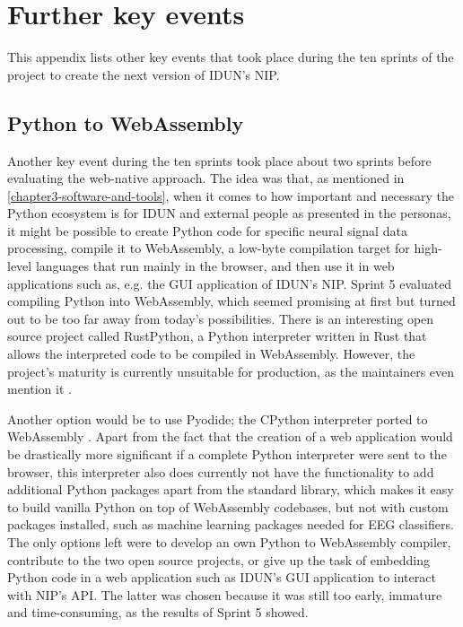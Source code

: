 \chapter{Further key events}
\label{appendix4-further-key-events}
\graphicspath{{Appendix4/Figs/}{Appendix4/Figs/}}

This appendix lists other key events that took place during the ten sprints of the project to create the next version of IDUN's NIP.

\section*{Python to WebAssembly}
\label{chapter4-python-to-webassembly}

Another key event during the ten sprints took place about two sprints before evaluating the web-native approach. The idea was that, as mentioned in \autoref{chapter3-software-and-tools}, when it comes to how important and necessary the Python ecosystem is for IDUN and external people as presented in the personas, it might be possible to create Python code for specific neural signal data processing, compile it to WebAssembly, a low-byte compilation target for high-level languages that run mainly in the browser, and then use it in web applications such as, e.g. the GUI application of IDUN's NIP. Sprint 5 evaluated compiling Python into WebAssembly, which seemed promising at first but turned out to be too far away from today's possibilities. There is an interesting open source project called RustPython, a Python interpreter written in Rust that allows the interpreted code to be compiled in WebAssembly. However, the project's maturity is currently unsuitable for production, as the maintainers even mention it \citep{noauthor_rustpython_2022}.

Another option would be to use Pyodide; the CPython interpreter ported to WebAssembly \citep{noauthor_pyodide_2022}. Apart from the fact that the creation of a web application would be drastically more significant if a complete Python interpreter were sent to the browser, this interpreter also does currently not have the functionality to add additional Python packages apart from the standard library, which makes it easy to build vanilla Python on top of WebAssembly codebases, but not with custom packages installed, such as machine learning packages needed for EEG classifiers. The only options left were to develop an own Python to WebAssembly compiler, contribute to the two open source projects, or give up the task of embedding Python code in a web application such as IDUN's GUI application to interact with NIP's API. The latter was chosen because it was still too early, immature and time-consuming, as the results of Sprint 5 showed.

